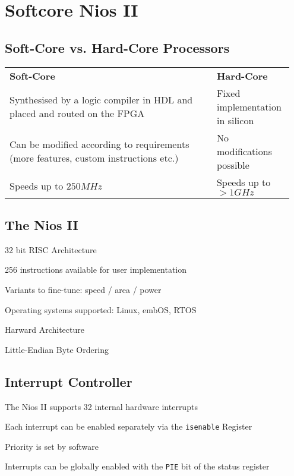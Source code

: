 \section{Softcore Nios II}		
	\subsection{Soft-Core vs. Hard-Core Processors }
		\begin{table}[H]
			\begin{tabular}{|p{0.7\linewidth}|p{0.25\linewidth}|}
				\hline
				\textbf{Soft-Core} 
				& \textbf{Hard-Core}\\
				\hhline{|=|=|}
				Synthesised by a logic compiler in HDL and placed and routed on the FPGA 
				& Fixed implementation in silicon\\
				\hline
				Can be modified according to requirements (more features, custom instructions etc.) 
				& No modifications possible\\
				\hline
				Speeds up to $250MHz$
				& Speeds up to $>1GHz$\\
				\hline			
			\end{tabular}
		\end{table}
	
	\subsection{The Nios II }
		\begin{multicols}{2}
			\begin{compactitem}
				\item 32 bit RISC Architecture
				\item 256 instructions available for user implementation
				\item Variants to fine-tune: speed / area / power
				\item Operating systems supported: Linux, embOS, RTOS
				\item Harward Architecture
				\item Little-Endian Byte Ordering
			\end{compactitem}
		\end{multicols}
	
	\subsection{Interrupt Controller \weekPageMaehne{2}{10}}
		\begin{multicols}{2}
			\begin{compactitem}
				\item The Nios II supports 32 internal hardware interrupts				
				\item Each interrupt can be enabled separately via the \texttt{isenable} Register
				\item Priority is set by software
				\item Interrupts can be globally enabled with the \texttt{PIE} bit of the status register
			\end{compactitem}
		\end{multicols}
	
